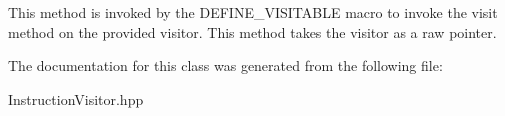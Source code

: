 This method is invoked by the D\+E\+F\+I\+N\+E\+\_\+\+V\+I\+S\+I\+T\+A\+B\+LE macro to invoke the visit method on the provided visitor. This method takes the visitor as a raw pointer. 

The documentation for this class was generated from the following file\+:\begin{DoxyCompactItemize}
\item 
Instruction\+Visitor.\+hpp\end{DoxyCompactItemize}
